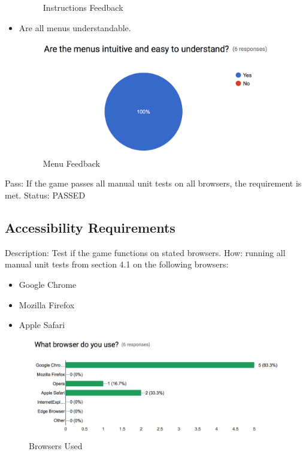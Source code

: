 \documentclass{article}
\begin{document}
\begin{itemize}
\begin{figure}[H]
	\caption{Instructions Feedback}
\end{figure}
\item Are all menus understandable.
\begin{figure}[H]
	\centering
	\includegraphics[width=\textwidth]{./Figures/15.png}
	\caption{Menu Feedback}
\end{figure}
\end{itemize}
Pass:  If the game passes all manual unit tests on all browsers, the requirement
 is met.\newline
 \newline
Status: PASSED


\subsection{Accessibility Requirements}
\label{sec:4.3}
Description: Test if the game functions on stated browsers.
How: running all manual unit tests from section 4.1 on the following browsers:
\begin{itemize}
\item Google Chrome
\item Mozilla Firefox
\item Apple Safari
\end{itemize}
\begin{figure}[H]
	\centering
	\includegraphics[width=\textwidth]{./Figures/9.png}
	\caption{Browsers Used}
\end{figure}
\end{document}
